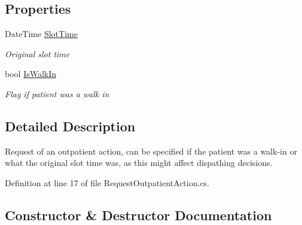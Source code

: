 \subsection*{Properties}
\begin{DoxyCompactItemize}
\item 
Date\+Time \hyperlink{class_general_health_care_elements_1_1_department_models_1_1_outpatient_1_1_request_outpatient_action_ac1ae13fe62c6b2285ca42ae099f85a57}{Slot\+Time}
\begin{DoxyCompactList}\small\item\em Original slot time \end{DoxyCompactList}\item 
bool \hyperlink{class_general_health_care_elements_1_1_department_models_1_1_outpatient_1_1_request_outpatient_action_ac80128e67ed9665a901e2129c43a7201}{Is\+Walk\+In}
\begin{DoxyCompactList}\small\item\em Flag if patient was a walk in \end{DoxyCompactList}\end{DoxyCompactItemize}


\subsection{Detailed Description}
Request of an outpatient action, can be specified if the patient was a walk-\/in or what the original slot time was, as this might affect dispathing decisions. 



Definition at line 17 of file Request\+Outpatient\+Action.\+cs.



\subsection{Constructor \& Destructor Documentation}
